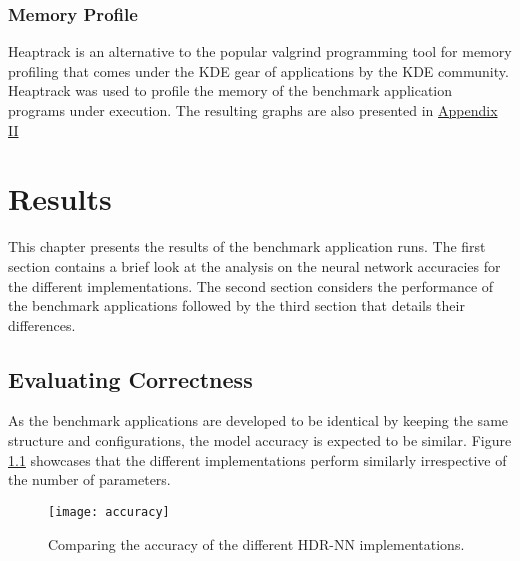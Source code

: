 \subsection{Memory Profile}

Heaptrack is an alternative to the popular valgrind programming tool for memory profiling that comes under the KDE gear of applications by the KDE community. Heaptrack was used to profile the memory of the benchmark application programs under execution. The resulting graphs are also presented in \hyperref[hdrnn-memory-profile]{Appendix II}



\chapter{Results}

This chapter presents the results of the benchmark application runs. The first section contains a brief look at the analysis on the neural network accuracies for the different implementations. The second section considers the performance of the benchmark applications followed by the third section that details their differences.


\section{Evaluating Correctness}

As the benchmark applications are developed to be identical by keeping the same structure and configurations, the model accuracy is expected to be similar. Figure \ref{hdrnn-accuracy} showcases that the different implementations perform similarly irrespective of the number of parameters.


\begin{figure}[!ht]
	\centering
	\texttt{[image: accuracy]}
	\caption[HDR-NN Accuracy]{Comparing the accuracy of the different HDR-NN implementations.}
	\label{hdrnn-accuracy}
\end{figure}

